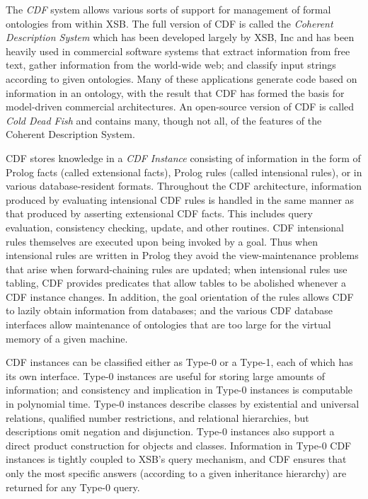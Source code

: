 The {\em CDF} system allows various sorts of support for management of
formal ontologies from within XSB.  The full version of CDF is called
the {\em Coherent Description System} which has been developed largely
by XSB, Inc and has been heavily used in commercial software systems
that extract information from free text, gather information from the
world-wide web; and classify input strings according to given
ontologies.  Many of these applications generate code based on
information in an ontology, with the result that CDF has formed the
basis for model-driven commercial architectures.  An open-source
version of CDF is called {\em Cold Dead Fish} and contains many,
though not all, of the features of the Coherent Description System.

CDF stores knowledge in a {\em CDF Instance} consisting of information
in the form of Prolog facts (called extensional facts), Prolog rules
(called intensional rules), or in various database-resident formats.
Throughout the CDF architecture, information produced by evaluating
intensional CDF rules is handled in the same manner as that produced
by asserting extensional CDF facts.  This includes query evaluation,
consistency checking, update, and other routines.  CDF intensional
rules themselves are executed upon being invoked by a goal.  Thus when
intensional rules are written in Prolog they avoid the
view-maintenance problems that arise when forward-chaining rules are
updated; when intensional rules use tabling, CDF provides predicates
that allow tables to be abolished whenever a CDF instance changes.  In
addition, the goal orientation of the rules allows CDF to lazily
obtain information from databases; and the various CDF database
interfaces allow maintenance of ontologies that are too large for the
virtual memory of a given machine.


CDF instances can be classified either as Type-0 or a Type-1, each of
which has its own interface.  Type-0 instances are useful for storing
large amounts of information; and consistency and implication in
Type-0 instances is computable in polynomial time.  Type-0 instances
describe classes by existential and universal relations, qualified
number restrictions, and relational hierarchies, but descriptions omit
negation and disjunction. Type-0 instances also support a direct
product construction for objects and classes.  
Information in Type-0 CDF instances is tightly coupled to XSB's
query mechanism, and CDF ensures that only the most specific answers
(according to a given inheritance hierarchy) are returned for any
Type-0 query.

